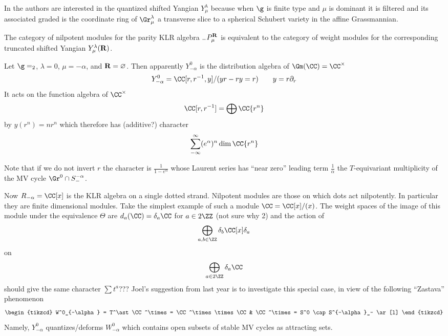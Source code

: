 % 
In \cite{kam19} the authors are interested in the quantized shifted Yangian $Y^\lambda_\mu$ because when $\g$ is finite type and $\mu$ is dominant it is filtered and its associated graded is the coordinate ring of $\Gr^\lambda_\mu$ a transverse slice to a spherical Schubert variety in the affine Grassmannian. 
%
\begin{theorem}\cite{kam19}
    The category of nilpotent modules for the parity KLR algebra ${}_-P_\mu^{{\bf R}}$ is equivalent to the category of weight modules for the corresponding truncated shifted Yangian $Y^\lambda_\mu({\bf R})$.
\end{theorem}
% 
\begin{example}
    Let $\g =\sl_2$, $\lambda = 0$, $\mu = -\alpha$, and ${\bf R} = \varnothing$. Then apparently $Y^0_{-\alpha}$ is the distribution algebra of $\Gm(\CC) = \CC^\times$
    $$Y^0_{-\alpha} = \CC[r,r^{-1},y]/(yr - ry = r) \qquad y = r\partial_r$$
    It acts on the function algebra of $\CC^\times$ 
    $$\CC[r,r^{-1}] = \bigoplus \CC\{r^n\}$$ 
    by $y(r^n) = n r^n$ which therefore has (additive?) character 
    $$\sum_{-\infty}^\infty (e^\alpha)^n\dim \CC\{r^n\}$$
    
    Note that if we do not invert $r$ the character is $\frac 1 {1-e^\alpha}$ whose Laurent series has ``near zero'' leading term $\frac 1 \alpha$ the $T$-equivariant multiplicity of the MV cycle $\Gr^0\cap S^{-\alpha}_-$.
    
    Now $R_{-\alpha} = \CC[x]$ is the KLR algebra on a single dotted strand. Nilpotent modules are those on which dots act nilpotently. In particular they are finite dimensional modules. Take the simplest example of such a module $\CC = \CC[x]/(x)$. The weight spaces of the image of this module under the \cite{kam19} equivalence $\Theta$ are $d_a(\CC) = \delta_a \CC$ for $a\in 2\ZZ$ (not sure why 2) and the action of 
    $$
    \bigoplus_{a,b\in\ZZ}\delta_b\CC[x]\delta_a
    $$
    on $$ \bigoplus_{a\in 2\ZZ}\delta_a\CC $$
    should give the same character $\sum t^a$???
    Joel's suggestion from last year is to investigate this special case, in view of the following ``Zastava'' phenomenon
    $$
    \begin{tikzcd}
        W^0_{-\alpha} = T^\ast \CC^\times = \CC^\times \times\CC & \CC^\times = S^0 \cap S^{-\alpha}_- \ar[l] 
    \end{tikzcd}
    $$
    Namely, $Y^0_{-\alpha}$ quantizes/deforms $W^0_{-\alpha}$ which contains open subsets of stable MV cycles as attracting sets. 
\end{example}